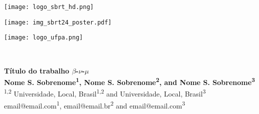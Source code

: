 \documentclass[a0,portrait]{a0poster}
\begin{document}
	\begin{mdframed}[style=MyFrame]
		
		\begin{minipage}[b]{0.33\linewidth}
			\raggedright
			\texttt{[image: logo\_sbrt\_hd.png]}
		\end{minipage}
		\begin{minipage}[b]{0.33\linewidth}
			\centering
			\texttt{[image: img\_sbrt24\_poster.pdf]}
		\end{minipage}
		\begin{minipage}[b]{0.33\linewidth}
			\raggedleft
			\texttt{[image: logo\_ufpa.png]}
		\end{minipage}\\
		
		\vspace{3cm}
		\begin{minipage}[h]{0.98\linewidth}
			\centering \huge \color{SteelBlue} \textbf{Título do trabalho $\beta$-$\nu$-$\mu$} \color{Black}\\ %
			\Large \textbf{Nome S. Sobrenome\textsuperscript{1}, Nome S. Sobrenome\textsuperscript{2}, and Nome S. Sobrenome\textsuperscript{3}}\\ %
			\normalsize \textsuperscript{1,2} Universidade, Local, Brasil\textsuperscript{1,2} and Universidade, Local, Brasil\textsuperscript{3}\\ %
			email@email.com\textsuperscript{1}, email@email.br\textsuperscript{2} and email@email.com\textsuperscript{3}\\
		\end{minipage}
		\vspace{0.5cm} %
		
		
		\begin{multicols}{2} %
			

\end{multicols}
\end{mdframed}
\end{document}
